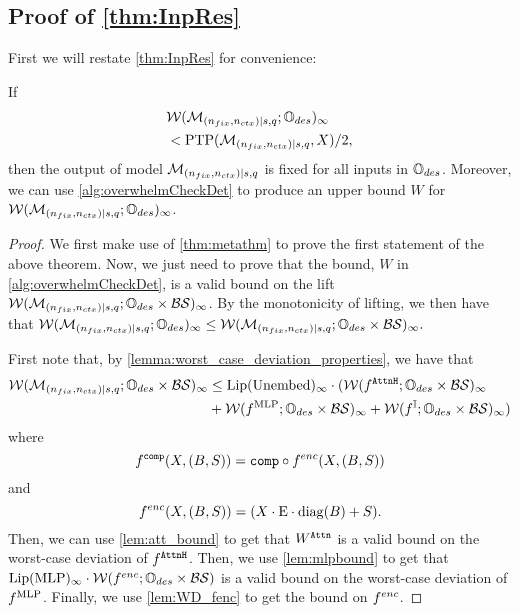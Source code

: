 \subsection{Proof of \cref{thm:InpRes}}
\label{subsec:InpResProof}
First we will restate \cref{thm:InpRes} for convenience:
\begin{theorem}
	If
	\begin{align*}
	    &\mathcal{W}(\mathcal{M}_{(n_{fix}, {n_{ctx}}) \mid {s}, q}; \mathbb{O}_{des})_\infty
	  \\&< \mathrm{PTP}(\mathcal{M}_{(n_{fix}, {n_{ctx}}) \mid {s}, q}, X) / 2,
	\end{align*}
	then the output of model $\mathcal{M}_{(n_{fix}, {n_{ctx}}) \mid {s}, q}$ is fixed for all inputs in $\mathbb{O}_{des}$.
	Moreover, we can use \cref{alg:overwhelmCheckDet} to produce an upper bound $W$ for $\mathcal{W}(\mathcal{M}_{(n_{fix}, {n_{ctx}}) \mid {s}, q}; \mathbb{O}_{des})_\infty$.
\end{theorem}
\begin{proof}
	We first make use of \cref{thm:metathm} to prove the first statement of the above theorem.
	Now, we just need to prove that the bound, $W$ in \cref{alg:overwhelmCheckDet}, is a valid bound on the lift $\mathcal{W}(\mathcal{M}_{(n_{fix}, {n_{ctx}}) \mid {s}, q}; \mathbb{O}_{des} \times \mathcal{B} \mathcal{S})_\infty$.
	By the monotonicity of lifting, we then have that $\mathcal{W}(\mathcal{M}_{(n_{fix}, {n_{ctx}}) \mid {s}, q}; \mathbb{O}_{des})_\infty \leq \mathcal{W}(\mathcal{M}_{(n_{fix}, {n_{ctx}}) \mid {s}, q}; \mathbb{O}_{des} \times \mathcal{B} \mathcal{S})_\infty.$

	First note that, by \cref{lemma:worst_case_deviation_properties}, we have that
	\begin{align*}
		\mathcal{W}(\mathcal{M}_{(n_{fix}, {n_{ctx}}) \mid {s}, q}; \mathbb{O}_{des} \times \mathcal{B} \mathcal{S})_\infty &\leq \mathrm{Lip}(\mathrm{Unembed})_\infty \cdot (\mathcal{W}(f^{\texttt{AttnH}}; \mathbb{O}_{des} \times \mathcal{B} \mathcal{S})_\infty \\ &+ \mathcal{W}(f^{\text{MLP}}; \mathbb{O}_{des} \times \mathcal{B} \mathcal{S})_\infty + \mathcal{W}(f^{\mathbb{I}}; \mathbb{O}_{des} \times \mathcal{B} \mathcal{S})_\infty) 
	\end{align*}
	where
	\[
		f^{{\texttt{comp}}}(X, (B, S)) = {\texttt{comp}} \circ f^{enc}(X, (B, S)) 
	\]
	and
	\[
		f^{enc}(X, (B, S)) = (X \cdot \text{E} \cdot \mathrm{diag}(B) + S).
	\]
	Then, we can use \cref{lem:att_bound} to get that $W^{\texttt{Attn}}$ is a valid bound on the worst-case deviation of $f^{\texttt{AttnH}}$.
	Then, we use \cref{lem:mlpbound} to get that $\mathrm{Lip}(\text{MLP})_\infty \cdot \mathcal{W}(f^{enc}; \mathbb{O}_{des} \times \mathcal{B}\mathcal{S})$ is a valid bound on the worst-case deviation of $f^{\text{MLP}}$.
	Finally, we use \cref{lem:WD_fenc} to get the bound on $f^{enc}$.
\end{proof}

